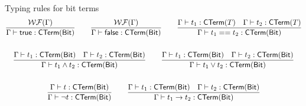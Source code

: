 Typing rules for bit terms
\begin{gather*}
    \frac{\mathcal{WF}(\Gamma)}{\Gamma \vdash \textsf{true} : \textsf{CTerm}(\textsf{Bit})}
    \qquad
    \frac{\mathcal{WF}(\Gamma)}{\Gamma \vdash \textsf{false} : \textsf{CTerm}(\textsf{Bit})}
    \qquad
    \frac{\Gamma \vdash t_1 : \textsf{CTerm}(T) \quad \Gamma \vdash t_2 : \textsf{CTerm}(T)}{\Gamma \vdash t_1 == t_2 : \textsf{CTerm}(\textsf{Bit})} \\
    \\
    \frac{\Gamma \vdash t_1 : \textsf{CTerm}(\textsf{Bit}) \quad \Gamma \vdash t_2 : \textsf{CTerm}(\textsf{Bit})}{\Gamma \vdash t_1 \wedge t_2 : \textsf{CTerm}(\textsf{Bit})}
    \qquad
    \frac{\Gamma \vdash t_1 : \textsf{CTerm}(\textsf{Bit}) \quad \Gamma \vdash t_2 : \textsf{CTerm}(\textsf{Bit})}{\Gamma \vdash t_1 \vee t_2 : \textsf{CTerm}(\textsf{Bit})} \\
    \\
    \frac{\Gamma \vdash t : \textsf{CTerm}(\textsf{Bit})}{\Gamma \vdash \neg t : \textsf{CTerm}(\textsf{Bit})}
    \qquad
    \frac{\Gamma \vdash t_1 : \textsf{CTerm}(\textsf{Bit}) \quad \Gamma \vdash t_2 : \textsf{CTerm}(\textsf{Bit})}{\Gamma \vdash t_1 \to t_2 : \textsf{CTerm}(\textsf{Bit})} \\
\end{gather*}

